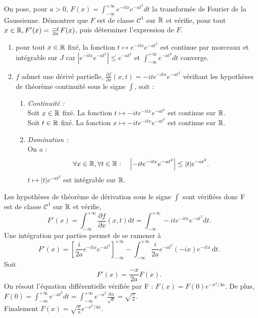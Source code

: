 \documentclass{book}
\begin{document}
\begin{Exemple}
On pose, pour $a>0$, $F(x)=\int^{+\infty}_{-\infty}e^{-itx}e^{-at^2}dt$ la transformée de Fourier de la Gaussienne.
Démontrer que $F$ est de classe $\mathcal{C}^1$ sur $\mathbb{R}$ et vérifie, pour tout $x\in\mathbb{R}, F'(x)=\frac{-x}{2a}F(x)$, puis
 déterminer l'expression de $F$.
\begin{enumerate}
\item   pour tout $x\in \mathbb{R}$ fixé, la fonction $t \mapsto e^{-itx}e^{-at^2}$
    est continue par morceaux et intégrable sur $J$ car $|e^{-itx}e^{-at^2}|\leq e^{-at^2}$ et $\int^{+\infty}_{-\infty}e^{-at^2}dt$ converge.
\item $f$ admet une dérivé partielle, $\frac{\partial f}{\partial x} (x,t)=-ite^{-itx}e^{-at^2}$ vérifiant les hypothèses de théorème continuité sous le signe $\int$, soit :
\begin{enumerate}
\item \textit{Continuité :}\\ 
Soit $x\in \mathbb{R}$ fixé. La fonction $t\mapsto -ite^{-itx}e^{-at^2}$ est continue  sur $\mathbb{R}$.\\
Soit $t\in \mathbb{R}$ fixé. La fonction $x\mapsto -ite^{-itx}e^{-at^2}$ est continue  sur  $\mathbb{R}$.
\item  \textit{Domination :}\\
On a :
$$\forall x\in \mathbb{R}, \forall t\in \mathbb{R}: \quad  \left|-ite^{-itx}e^{-at^2}\right|\leq |t|e^{-at^2}.$$
$t\mapsto |t|e^{-at^2}$ est intégrable sur $\mathbb{R}$.\\
\end{enumerate}
\end{enumerate} 
Les hypothèses de théorème de dérivation sous le signe $\int$ sont vérifiées donc F est de classe $\mathcal{C}^1$ sur $\mathbb{R}$ et vérifie,
$$F'(x)=\int^{+\infty}_{-\infty} \frac{\partial f}{\partial x} (x,t) \mathrm dt =\int^{+\infty}_{-\infty} -ite^{-itx}e^{-at^2}\mathrm dt.$$
Une intégration par parties permet de se ramener à 
$$F'(x)=\left[\frac{i}{2a}e^{-itx}e^{-at^2} \right]_{-\infty}^{+\infty}- \int^{+\infty}_{-\infty}\frac{i}{2a}e^{-at^2} (-ix)e^{-itx}\, \mathrm dt.$$
Soit
$$F'(x)=\frac{-x}{2a}F(x).$$
On résout l'équation différentielle vérifiée par F : $F(x)=F(0)e^{-x^2/4a}$. De plus,
$F(0)=\int^{+\infty}_{-\infty}e^{-at^2}dt=\int^{+\infty}_{-\infty}e^{-u^2} \frac{\mathrm du}{\sqrt{a}}= \sqrt{\frac \pi a}$.\\
Finalement $F(x)= \sqrt{\frac \pi a} e^{-x^2/4a}$.
\end{Exemple}
\end{document}
